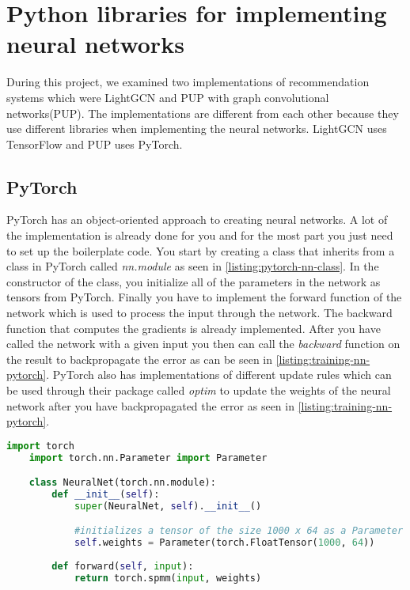 \section{Python libraries for implementing neural networks}
During this project, we examined two implementations of recommendation systems which were LightGCN and PUP with graph convolutional networks(PUP). 
The implementations are different from each other because they use different libraries when implementing the neural networks.
LightGCN uses TensorFlow and PUP uses PyTorch.

\subsection{PyTorch}
PyTorch has an object-oriented approach to creating neural networks.
A lot of the implementation is already done for you and for the most part you just need to set up the boilerplate code.
You start by creating a class that inherits from a class in PyTorch called \textit{nn.module} as seen in \autoref{listing:pytorch-nn-class}.
In the constructor of the class, you initialize all of the parameters in the network as tensors from PyTorch.
Finally you have to implement the forward function of the network which is used to process the input through the network.
The backward function that computes the gradients is already implemented.
After you have called the network with a given input you then can call the \textit{backward} function on the result to backpropagate the error as can be seen in \autoref{listing:training-nn-pytorch}.
PyTorch also has implementations of different update rules which can be used through their package called \textit{optim} to update the weights of the neural network after you have backpropagated the error as seen in \autoref{listing:training-nn-pytorch}.

\begin{lstlisting}[language=Python, caption={Class implementing a neural network in PyTorch}, captionpos=b, label={listing:pytorch-nn-class}]
	import torch
	import torch.nn.Parameter import Parameter

	class NeuralNet(torch.nn.module):
		def __init__(self):
			super(NeuralNet, self).__init__()

			#initializes a tensor of the size 1000 x 64 as a Parameter in the neural network
			self.weights = Parameter(torch.FloatTensor(1000, 64))
		
		def forward(self, input):
			return torch.spmm(input, weights)

\end{lstlisting}

